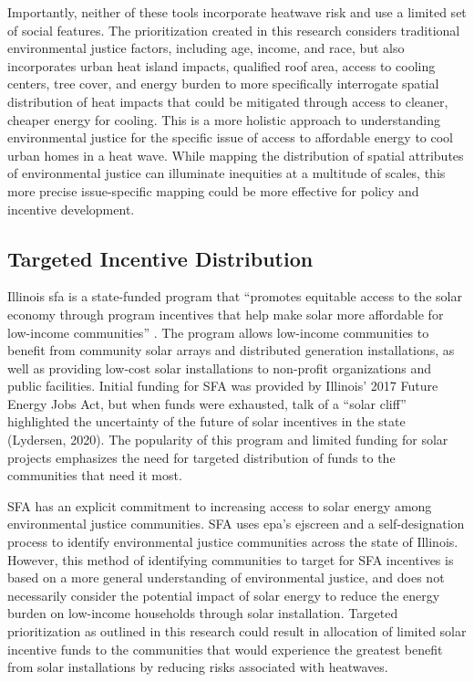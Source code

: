 Importantly, neither of these tools incorporate heatwave risk and use a limited
set of social features. The prioritization created in this research considers
traditional environmental justice factors, including age, income, and race, but
also incorporates urban heat island impacts, qualified roof area, access to cooling
centers, tree cover, and energy burden to more specifically interrogate spatial
distribution of heat impacts that could be mitigated through access to cleaner,
cheaper energy for cooling. This is a more holistic approach to understanding
environmental justice for the specific issue of access to affordable energy to
cool urban homes in a heat wave. While mapping the distribution of spatial
attributes of environmental justice can illuminate inequities at a multitude of
scales, this more precise issue-specific mapping could be more effective for
policy and incentive development.

\subsection{Targeted Incentive Distribution}

Illinois \ac{sfa} is a state-funded program that “promotes equitable access to
the solar economy through program incentives that help make solar more affordable
for low-income communities” \cite{illinois_solar_for_all_environmental_2022}. The
program allows low-income communities to benefit from community solar arrays and
distributed generation installations, as well as providing low-cost solar
installations to non-profit organizations and public facilities. Initial funding
for SFA was provided by Illinois' 2017 Future Energy Jobs Act, but when funds were
exhausted, talk of a “solar cliff” highlighted the uncertainty of the future of
solar incentives in the state (Lydersen, 2020). The popularity of this program
and limited funding for solar projects emphasizes the need for targeted distribution
of funds to the communities that need it most.

SFA has an explicit commitment to increasing access to solar energy among
environmental justice communities. SFA uses \ac{epa}’s \ac{ejscreen} and a
self-designation  process to identify environmental justice communities across
the state of Illinois. However, this method of identifying communities to target
for SFA incentives is based on a more general understanding of environmental
justice, and does not necessarily consider the potential impact of solar energy
to reduce the energy burden on low-income households through solar installation.
Targeted prioritization as outlined in this research could result in allocation
of limited solar incentive funds to the communities that would experience the
greatest benefit from solar installations by reducing risks associated with heatwaves.
